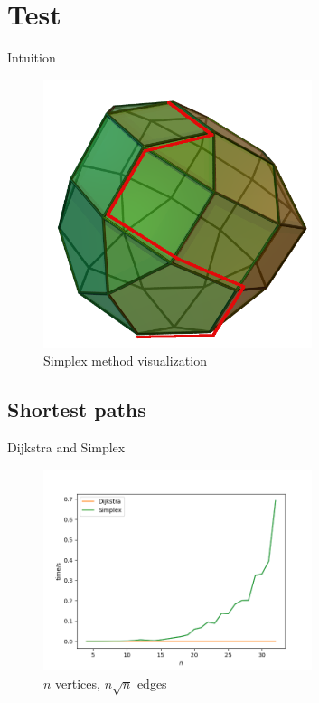 \section{Test}

\begin{frame}{Intuition}

    \begin{figure}
        \includegraphics[width=0.7\textwidth]{assets/simplex_method_3d.png}
        \caption{Simplex method visualization}
    \end{figure}

\end{frame}

\subsection{Shortest paths}

\begin{frame}{Dijkstra and Simplex}

    \begin{figure}
        \includegraphics[width=0.7\textwidth]{assets/shortest_path_compare.png}
        \caption{$n$ vertices, $n\sqrt{n}$ edges}
    \end{figure}

\end{frame}

